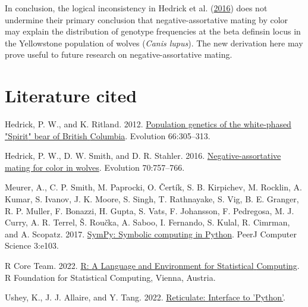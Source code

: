 \documentclass[
]{article}
\newlength{\cslhangindent}
\newlength{\cslentryspacingunit} %
\newenvironment{CSLReferences}[2] %
 {%
  \setlength{\parindent}{0pt}
  \ifodd #1
  \let\oldpar\par
  \def\par{\hangindent=\cslhangindent\oldpar}
  \fi
  \setlength{\parskip}{#2\cslentryspacingunit}
 }%
 {}
\begin{document}
In conclusion, the logical inconsistency in Hedrick et al. (\protect\hyperlink{ref-hedrick_negative-assortative_2016}{2016}) does not undermine their primary conclusion that negative-assortative mating by color may explain the distribution of genotype frequencies at the beta definsin locus in the Yellowstone population of wolves (\emph{Canis lupus}). The new derivation here may prove useful to future research on negative-assortative mating.

\hypertarget{literature-cited}{%
\section*{Literature cited}\label{literature-cited}}

\hypertarget{refs}{}
\begin{CSLReferences}{1}{0}
\leavevmode{}%
Hedrick, P. W., and K. Ritland. 2012. \href{https://doi.org/10.1111/j.1558-5646.2011.01463.x}{Population genetics of the white-phased "{Spirit}" bear of {British} {Columbia}}. Evolution 66:305--313.

\leavevmode{}%
Hedrick, P. W., D. W. Smith, and D. R. Stahler. 2016. \href{https://doi.org/10.1111/evo.12906}{Negative-assortative mating for color in wolves}. Evolution 70:757--766.

\leavevmode{}%
Meurer, A., C. P. Smith, M. Paprocki, O. Čertík, S. B. Kirpichev, M. Rocklin, A. Kumar, S. Ivanov, J. K. Moore, S. Singh, T. Rathnayake, S. Vig, B. E. Granger, R. P. Muller, F. Bonazzi, H. Gupta, S. Vats, F. Johansson, F. Pedregosa, M. J. Curry, A. R. Terrel, Š. Roučka, A. Saboo, I. Fernando, S. Kulal, R. Cimrman, and A. Scopatz. 2017. \href{https://doi.org/10.7717/peerj-cs.103}{{SymPy}: Symbolic computing in {Python}}. PeerJ Computer Science 3:e103.

\leavevmode{}%
R Core Team. 2022. \href{http://www.R-project.org/}{R: {A} {Language} and {Environment} for {Statistical} {Computing}}. R Foundation for Statistical Computing, Vienna, Austria.

\leavevmode{}%
Ushey, K., J. J. Allaire, and Y. Tang. 2022. \href{https://CRAN.R-project.org/package=reticulate}{Reticulate: {Interface} to '{Python}'}.

\end{CSLReferences}
\end{document}
